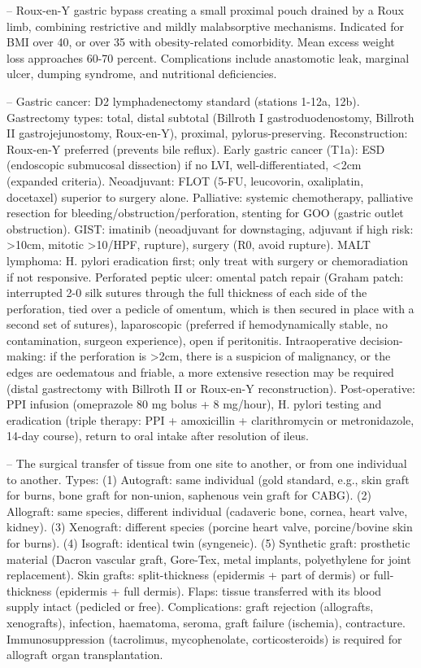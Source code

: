 -- Roux-en-Y gastric bypass creating a small proximal pouch drained by a Roux limb, combining restrictive and mildly malabsorptive mechanisms. Indicated for BMI over 40, or over 35 with obesity-related comorbidity. Mean excess weight loss approaches 60-70 percent. Complications include anastomotic leak, marginal ulcer, dumping syndrome, and nutritional deficiencies.

-- Gastric cancer: D2 lymphadenectomy standard (stations 1-12a, 12b). Gastrectomy types: total, distal subtotal (Billroth I gastroduodenostomy, Billroth II gastrojejunostomy, Roux-en-Y), proximal, pylorus-preserving. Reconstruction: Roux-en-Y preferred (prevents bile reflux). Early gastric cancer (T1a): ESD (endoscopic submucosal dissection) if no LVI, well-differentiated, <2cm (expanded criteria). Neoadjuvant: FLOT (5-FU, leucovorin, oxaliplatin, docetaxel) superior to surgery alone. Palliative: systemic chemotherapy, palliative resection for bleeding/obstruction/perforation, stenting for GOO (gastric outlet obstruction). GIST: imatinib (neoadjuvant for downstaging, adjuvant if high risk: >10cm, mitotic >10/HPF, rupture), surgery (R0, avoid rupture). MALT lymphoma: H. pylori eradication first; only treat with surgery or chemoradiation if not responsive. Perforated peptic ulcer: omental patch repair (Graham patch: interrupted 2-0 silk sutures through the full thickness of each side of the perforation, tied over a pedicle of omentum, which is then secured in place with a second set of sutures), laparoscopic (preferred if hemodynamically stable, no contamination, surgeon experience), open if peritonitis. Intraoperative decision-making: if the perforation is >2cm, there is a suspicion of malignancy, or the edges are oedematous and friable, a more extensive resection may be required (distal gastrectomy with Billroth II or Roux-en-Y reconstruction). Post-operative: PPI infusion (omeprazole 80 mg bolus + 8 mg/hour), H. pylori testing and eradication (triple therapy: PPI + amoxicillin + clarithromycin or metronidazole, 14-day course), return to oral intake after resolution of ileus.

-- The surgical transfer of tissue from one site to another, or from one individual to another. Types: (1) Autograft: same individual (gold standard, e.g., skin graft for burns, bone graft for non-union, saphenous vein graft for CABG). (2) Allograft: same species, different individual (cadaveric bone, cornea, heart valve, kidney). (3) Xenograft: different species (porcine heart valve, porcine/bovine skin for burns). (4) Isograft: identical twin (syngeneic). (5) Synthetic graft: prosthetic material (Dacron vascular graft, Gore-Tex, metal implants, polyethylene for joint replacement). Skin grafts: split-thickness (epidermis + part of dermis) or full-thickness (epidermis + full dermis). Flaps: tissue transferred with its blood supply intact (pedicled or free). Complications: graft rejection (allografts, xenografts), infection, haematoma, seroma, graft failure (ischemia), contracture. Immunosuppression (tacrolimus, mycophenolate, corticosteroids) is required for allograft organ transplantation.

